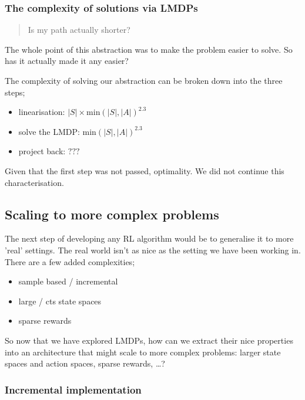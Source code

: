 \subsubsection{The complexity of solutions via LMDPs}

\begin{quote}
Is my path actually shorter?
\end{quote}

The whole point of this abstraction was to make the problem easier to
solve. So has it actually made it any easier?

The complexity of solving our abstraction can be broken down into the
three steps;

\begin{itemize}
\tightlist
\item
  linearisation: \(|S| \times \text{min}(|S|,|A|)^{2.3}\)
\item
  solve the LMDP: \(\text{min}(|S|,|A|)^{2.3}\)
\item
  project back: \(???\)
\end{itemize}

Given that the first step was not passed, optimality. We did not continue this characterisation.

\subsection{Scaling to more complex problems}

The next step of developing any RL algorithm would be to generalise it to more 'real' settings.
The real world isn't as nice as the setting we have been working in. There are a few added complexities;

\begin{itemize}
\tightlist
\item
  sample based / incremental
\item
  large / cts state spaces
\item
  sparse rewards
\end{itemize}

So now that we have explored LMDPs, how can we extract their nice
properties into an architecture that might scale to more complex
problems: larger state spaces and action spaces, sparse rewards,
\ldots{}?

\subsubsection{Incremental implementation}

